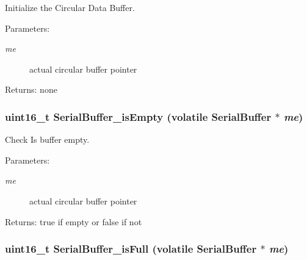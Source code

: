 Initialize the Circular Data Buffer. \begin{Desc}
\item[Parameters:]
\begin{description}
\item[{\em me}]actual circular buffer pointer \end{description}
\end{Desc}
\begin{Desc}
\item[Returns:]none \end{Desc}
\hypertarget{group__serialbuffer_g1e7c23fc0a9712d2e3097154c8b85a6f}{
\subsubsection[{SerialBuffer\_\-isEmpty}]{\setlength{\rightskip}{0pt plus 5cm}uint16\_\-t SerialBuffer\_\-isEmpty (volatile {\bf SerialBuffer} $\ast$ {\em me})}}
\label{group__serialbuffer_g1e7c23fc0a9712d2e3097154c8b85a6f}


Check Is buffer empty. \begin{Desc}
\item[Parameters:]
\begin{description}
\item[{\em me}]actual circular buffer pointer \end{description}
\end{Desc}
\begin{Desc}
\item[Returns:]true if empty or false if not \end{Desc}
\hypertarget{group__serialbuffer_g522e245db6b26c1b5dc72ec08d84e7d0}{
\subsubsection[{SerialBuffer\_\-isFull}]{\setlength{\rightskip}{0pt plus 5cm}uint16\_\-t SerialBuffer\_\-isFull (volatile {\bf SerialBuffer} $\ast$ {\em me})}}
\label{group__serialbuffer_g522e245db6b26c1b5dc72ec08d84e7d0}


